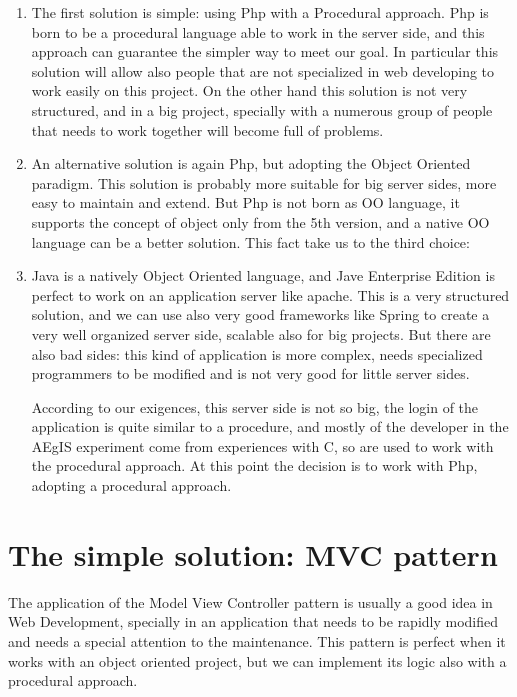 \begin{enumerate}

\item
The first solution is simple: using Php with a Procedural approach. Php is born to be a procedural language able to work in the server side, and this approach can guarantee the simpler way to meet our goal. In particular this solution will allow also people that are not specialized in web developing to work easily on this project. On the other hand this solution is not very structured, and in a big project, specially with a numerous group of people that needs to work together will become full of problems.

\item
An alternative solution is again Php, but adopting the Object Oriented paradigm. This solution is probably more suitable for big server sides, more easy to maintain and extend. But Php is not born as OO language, it supports the concept of object only from the 5th version, and a native OO language can be a better solution. This fact take us to the third choice:

\item
Java is a natively Object Oriented language, and Jave Enterprise Edition is perfect to work on an application server like apache. This is a very structured solution, and we can use also very good frameworks like Spring to create a very well organized server side, scalable also for big projects. But there are also bad sides: this kind of application is more complex, needs specialized programmers to be modified and is not very good for little server sides. 

According to our exigences, this server side is not so big, the login of the application is quite similar to a procedure, and mostly of the developer in the AEgIS experiment come from experiences with C, so are used to work with the procedural approach. At this point the decision is to work with Php, adopting a procedural approach.  

\end{enumerate}
 
\section{The simple solution: MVC pattern}

The application of the Model View Controller pattern is usually a good idea in Web Development, specially in an application that needs to be rapidly modified and needs a special attention to the maintenance. This pattern is perfect when it works with an object oriented project, but we can implement its logic also with a procedural approach.

